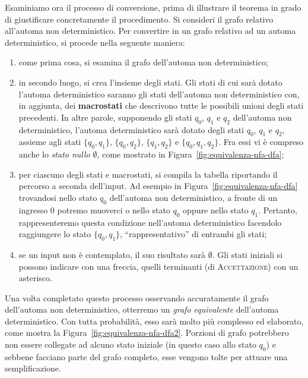 \documentclass[10pt]{\classname}
\theoremstyle{definition}
\theoremstyle{definition}
\theoremstyle{definition}
\theoremstyle{definition}
\begin{document}
Esaminiamo ora il processo di conversione, prima di illustrare il teorema in grado di giustificare concretamente il procedimento. Si consideri il grafo relativo all'automa non deterministico. Per convertire in
un grafo relativo ad un automa deterministico, si procede nella seguente
maniera:
\begin{enumerate}
    \item come prima cosa, si esamina il grafo dell'automa non deterministico;
    \item in secondo luogo, si crea l'insieme degli stati. Gli stati di cui
        sarà dotato l'automa deterministico saranno gli stati dell'automa non
        deterministico con, in aggiunta, dei \textbf{macrostati} che descrivono
        tutte le possibili unioni degli stati precedenti. In altre parole,
        supponendo gli stati $q_0$, $q_1$ e $q_2$ dell'automa non
        deterministico, l'automa deterministico sarà dotato degli stati $q_0$,
        $q_1$ e $q_2$, assieme agli stati $\{q_0, q_1\}$, $\{q_0, q_2\}$,
        $\{q_1, q_2\}$ e $\{q_0, q_1, q_2\}$. Fra essi vi è compreso
        anche lo \emph{stato nullo} $\emptyset$, come mostrato in
        Figura~\ref{fig:equivalenza-nfa-dfa};
    \item per ciascuno degli stati e macrostati, si compila la tabella
        riportando il percorso a seconda dell'input. Ad esempio in
        Figura~\ref{fig:equivalenza-nfa-dfa} trovandosi nello stato $q_0$
        dell'automa non deterministico, a fronte di un ingresso 0 potremo
        muoverci o nello stato $q_0$ oppure nello stato $q_1$. Pertanto,
        rappresenteremo questa condizione nell'automa deterministico facendolo
        raggiungere lo stato $\{q_0, q_1\}$, ``rappresentativo'' di entrambi
        gli stati;
    \item se un input non è contemplato, il suo risultato sarà $\emptyset$. Gli
        stati iniziali si possono indicare con una freccia, quelli terminanti
        (di \textsc{Accettazione}) con un asterisco.
\end{enumerate}

Una volta completato questo processo osservando accuratamente il grafo
dell'automa non deterministico, otterremo un \emph{grafo equivalente}
dell'automa deterministico. Con tutta probabilità, esso sarà molto più
complesso ed elaborato, come mostra la Figura~\ref{fig:equivalenza-nfa-dfa2}.
Porzioni di grafo potrebbero non essere collegate ad alcuno stato iniziale (in
questo caso allo stato $q_0$) e sebbene facciano parte del grafo completo, esse
vengono tolte per attuare una semplificazione.
\end{document}
